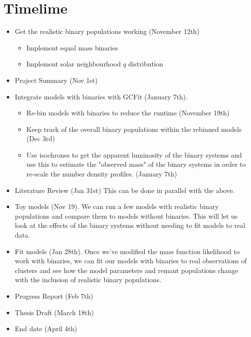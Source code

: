 \documentclass[12pt,letterpaper]{article}
\begin{document}
\section{Timelime}
\begin{itemize}
	\item Get the realistic binary populations working (November 12th)
	      \begin{itemize}
		      \item Implement equal mass binaries
		      \item Implement solar neighbourhood $q$ distribution
	      \end{itemize}
	\item Project Summary (Nov 1st)
	\item Integrate models with binaries with GCFit (January 7th).
	      \begin{itemize}
		      \item Re-bin models with binaries to reduce the runtime (November 19th)
		      \item Keep track of the overall binary populations within the rebinned models (Dec 3rd)
		      \item Use isochrones to get the apparent luminosity of the binary systems and
		            use this to estimate the "observed mass" of the binary systems in order
		            to re-scale the number density profiles. (January 7th)
	      \end{itemize}
	\item Literature Review (Jan 31st) This can be done in parallel with the above.
	\item Toy models (Nov 19). We can run a few models with realistic binary populations and
	      compare them to models without binaries. This will let us look at the effects of the
	      binary systems without needing to fit models to real data.
	\item Fit models (Jan 28th). Once we've modified the mass function likelihood to work with
	      binaries, we can fit our models with binaries to real observations of clusters and see
	      how the model parameters and remant populations change with the inclusion of realistic
	      binary populations.
	\item Progress Report (Feb 7th)
	\item Thesis Draft (March 18th)
	\item End date (April 4th)
\end{itemize}
\end{document}

